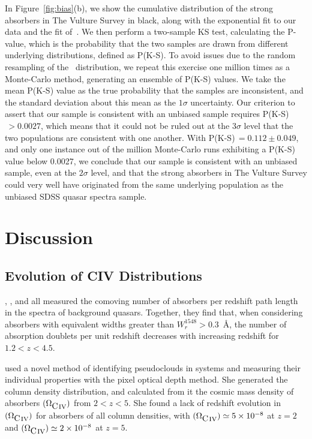 \documentclass[linenumbers,twocolumn]{aastex61}
\begin{document}
In Figure~\ref{fig:bias}(b), we show the cumulative distribution of the strong absorbers in The Vulture Survey in black, along with the exponential fit to our data and the fit of~\cite{Cooksey2013}. We then perform a two-sample KS test, calculating the P-value, which is the probability that the two samples are drawn from different underlying distributions, defined as P(K-S). To avoid issues due to the random resampling of the~\cite{Cooksey2013} distribution, we repeat this exercise one million times as a Monte-Carlo method, generating an ensemble of P(K-S) values. We take the mean P(K-S) value as the true probability that the samples are inconsistent, and the standard deviation about this mean as the $1\sigma$ uncertainty. Our criterion to assert that our sample is consistent with an unbiased sample requires P(K-S)$\, > 0.0027$, which means that it could not be ruled out at the $3\sigma$ level that the two populations are consistent with one another. With P(K-S)$\, = 0.112 \pm 0.049$, and only one instance out of the million Monte-Carlo runs exhibiting a P(K-S) value below 0.0027, we conclude that our sample is consistent with an unbiased sample, even at the $2\sigma$ level, and that the strong absorbers in The Vulture Survey could very well have originated from the same underlying population as the unbiased SDSS quasar spectra sample.

\section{Discussion}
\label{sec:discussion}

\subsection{Evolution of CIV Distributions}

\cite{Steidel1990}, \cite{Sargent1988}, and \cite{Misawa2002} all measured the comoving number of {\CIV} absorbers per redshift path length in the spectra of background quasars. Together, they find that, when considering {\CIV} absorbers with equivalent widths greater than $W_r^{1548} > 0.3$~\AA, the number of absorption doublets per unit redshift decreases with increasing redshift for $1.2 < z < 4.5$.

\cite{Songaila2005} used a novel method of identifying pseudoclouds in {\CIVdblt} systems and measuring their individual properties with the pixel optical depth method. She generated the {\CIV} column density distribution, and calculated from it the cosmic mass density of {\CIV} absorbers $(\Omega_{\hbox{{\rm C}\kern 0.1em{\sc iv}}})$ from $2 < z < 5$. She found a lack of redshift evolution in $(\Omega_{\hbox{{\rm C}\kern 0.1em{\sc iv}}})$ for absorbers of all column densities, with $(\Omega_{\hbox{{\rm C}\kern 0.1em{\sc iv}}}) \simeq 5 \times 10^{-8}$ at $z = 2$ and $(\Omega_{\hbox{{\rm C}\kern 0.1em{\sc iv}}}) \simeq 2 \times 10^{-8}$ at $z = 5$. %
\end{document}
